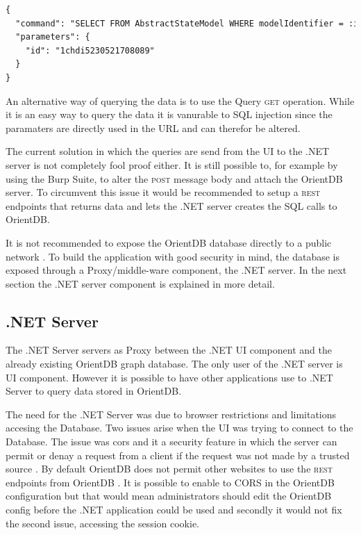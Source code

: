 \begin{lstlisting}[language=xml, caption=Get AbstractStateModel by the model identifier, label=code:example-body]
{
  "command": "SELECT FROM AbstractStateModel WHERE modelIdentifier = :id",
  "parameters": {
    "id": "1chdi5230521708089"
  }
}
\end{lstlisting}

An alternative way of querying the data is to use the Query \textsc{get} operation. While it is an easy way to query the data it is vanurable to SQL injection since the paramaters are directly used in the URL and can therefor be altered.

The current solution in which the queries are send from the UI to the .NET server is not completely fool proof either. It is still possible to, for example by using the Burp Suite, to alter the \textsc{post} message body and attach the OrientDB server. To circumvent this issue it would be recommended to setup a \textsc{rest} endpoints that returns data and lets the .NET server creates the SQL calls to OrientDB. 

It is not recommended to expose the OrientDB database directly to a public network \cite{orientdb-security}. To build the application with good security in mind, the database is exposed through a Proxy/middle-ware component, the .NET server. In the next section the .NET server component is explained in more detail.

\subsection{.NET Server}

The .NET Server servers as Proxy between the .NET UI component and the already existing OrientDB graph database. The only user of the .NET server is UI component. However it is possible to have other applications use to .NET Server to query data stored in OrientDB. 

The need for the .NET Server was due to browser restrictions and limitations accesing the Database. Two issues arise when the UI was trying to connect to the Database. The issue was \acrfull{cors} and it a security feature in which the server can permit or denay a request from a client if the request was not made by a trusted source \cite{cors}. By default OrientDB does not permit other websites to use the \textsc{rest} endpoints from OrientDB \cite{orientdb-webserver}. It is possible to enable to CORS in the OrientDB configuration but that would mean administrators should edit the OrientDB config before the .NET application could be used and secondly it would not fix the second issue, accessing the session cookie.

